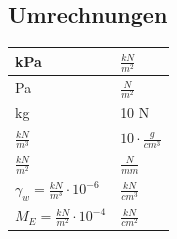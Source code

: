 \begin{minipage}[t]{0.25\linewidth}	
	\subsection{Umrechnungen}
	\begin{tabular}{|l|l|}
	\hline
	kPa 				& $\frac{kN}{m^2}$ \\ \hline
	Pa					& $\frac{N}{m^2}$  \\ \hline
	kg					& 10 N				\\ \hline
	$\frac{kN}{m^3}$	& $10 \cdot \frac{g}{cm^3}$ \\ \hline
	$\frac{kN}{m^2}$	& $\frac{N}{mm}$	\\ \hline
	$\gamma_w=\frac{kN}{m^3}\cdot 10^{-6}$ & $\frac{kN}{cm^3}$ \\ \hline
	$M_E=\frac{kN}{m^2}\cdot 10^{-4}$ & $\frac{kN}{cm^2}$	\\ \hline
	\end{tabular}
\end{minipage}
